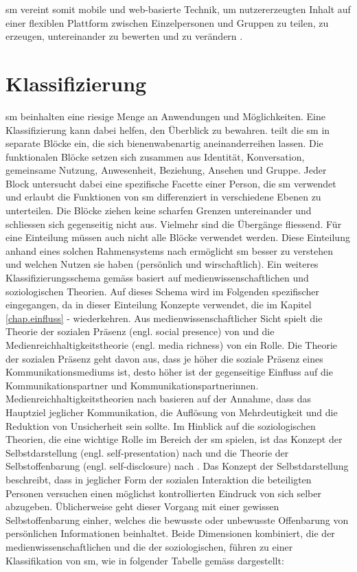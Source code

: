 \gls{sm} vereint somit mobile und web-basierte Technik, um nutzererzeugten Inhalt auf einer flexiblen Plattform zwischen Einzelpersonen und Gruppen zu teilen, zu erzeugen, untereinander zu bewerten und zu verändern \cite{Kietzmann:2011}.
 
\section{Klassifizierung}\label{sec.klassifiezierung}
\gls{sm} beinhalten eine riesige Menge an Anwendungen und Möglichkeiten. Eine Klassifizierung kann dabei helfen, den Überblick zu bewahren.  teilt die \gls{sm} in separate Blöcke ein, die sich bienenwabenartig aneinanderreihen lassen. Die funktionalen Blöcke setzen sich zusammen aus Identität, Konversation, gemeinsame Nutzung, Anwesenheit, Beziehung, Ansehen und Gruppe. Jeder Block untersucht dabei eine spezifische Facette einer Person, die \gls{sm} verwendet und erlaubt die Funktionen von \gls{sm} differenziert in verschiedene Ebenen zu unterteilen. Die Blöcke ziehen keine scharfen Grenzen untereinander und schliessen sich gegenseitig nicht aus. Vielmehr sind die Übergänge fliessend. Für eine Einteilung müssen auch nicht alle Blöcke verwendet werden. Diese Einteilung anhand eines solchen Rahmensystems nach \citeauthor{Kietzmann:2011} ermöglicht \gls{sm} besser zu verstehen und welchen Nutzen sie haben (persönlich und wirschaftlich). \newline
Ein weiteres Klassifizierungsschema gemäss  basiert auf medienwissenschaftlichen und soziologischen Theorien. Auf dieses Schema wird im Folgenden spezifischer eingegangen, da in dieser Einteilung Konzepte verwendet, die im Kapitel \ref{chap.einfluss} -  wiederkehren. Aus medienwissenschaftlicher Sicht spielt die Theorie der sozialen Präsenz (engl. social presence) von  und die Medienreichhaltigkeitstheorie (engl. media richness) von  ein Rolle. Die Theorie der sozialen Präsenz geht davon aus, dass je höher die soziale Präsenz eines Kommunikationsmediums ist, desto höher ist der gegenseitige Einfluss auf die Kommunikationspartner und Kommunikationspartnerinnen. Medienreichhaltigkeitstheorien nach  basieren auf der Annahme, dass das Hauptziel jeglicher Kommunikation, die Auflösung von Mehrdeutigkeit und die Reduktion von Unsicherheit sein sollte. Im Hinblick auf die soziologischen Theorien, die eine wichtige Rolle im Bereich der \gls{sm} spielen, ist das Konzept der Selbstdarstellung (engl. self-presentation) nach  und die Theorie der Selbstoffenbarung (engl. self-disclosure) nach . Das Konzept der Selbstdarstellung beschreibt, dass in jeglicher Form der sozialen Interaktion die beteiligten Personen versuchen einen möglichst kontrollierten Eindruck von sich selber abzugeben. Üblicherweise geht dieser Vorgang mit einer gewissen Selbstoffenbarung einher, welches die bewusste oder unbewusste Offenbarung von persönlichen Informationen beinhaltet. Beide Dimensionen kombiniert, die der medienwissenschaftlichen und die der soziologischen,  führen zu einer Klassifikation von \gls{sm}, wie in folgender Tabelle gemäss  dargestellt:	
